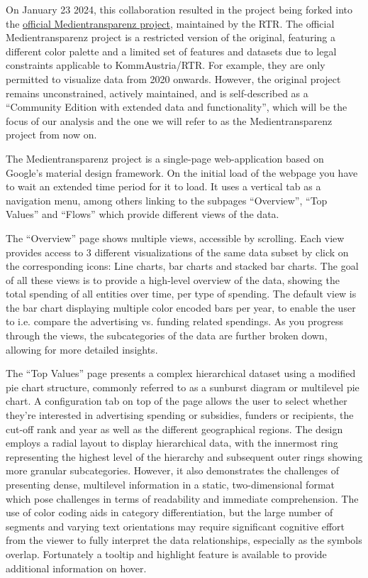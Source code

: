 \documentclass{vgtc}
\begin{document}
On January 23 2024, this collaboration resulted in the project being forked into the \href{https://visualisierung.medientransparenz.rtr.at/home}{official Medientransparenz project}, maintained by the RTR. The official Medientransparenz project is a restricted version of the original, featuring a different color palette and a limited set of features and datasets due to legal constraints applicable to KommAustria/RTR. For example, they are only permitted to visualize data from 2020 onwards. However, the original project remains unconstrained, actively maintained, and is self-described as a ``Community Edition with extended data and functionality'', which will be the focus of our analysis and the one we will refer to as the Medientransparenz project from now on.

The Medientransparenz project is a single-page web-application based on Google's material design framework. On the initial load of the webpage you have to wait an extended time period for it to load. It uses a vertical tab as a navigation menu, among others linking to the subpages ``Overview'', ``Top Values'' and ``Flows'' which provide different views of the data.

The ``Overview'' page shows multiple views, accessible by scrolling. Each view provides access to 3 different visualizations of the same data subset by click on the corresponding icons: Line charts, bar charts and stacked bar charts. The goal of all these views is to provide a high-level overview of the data, showing the total spending of all entities over time, per type of spending. The default view is the bar chart displaying multiple color encoded bars per year, to enable the user to i.e. compare the advertising vs. funding related spendings. As you progress through the views, the subcategories of the data are further broken down, allowing for more detailed insights. 

The ``Top Values'' page presents a complex hierarchical dataset using a modified pie chart structure, commonly referred to as a sunburst diagram or multilevel pie chart. A configuration tab on top of the page allows the user to select whether they're interested in advertising spending or subsidies, funders or recipients, the cut-off rank and year as well as the different geographical regions.
The design employs a radial layout to display hierarchical data, with the innermost ring representing the highest level of the hierarchy and subsequent outer rings showing more granular subcategories. However, it also demonstrates the challenges of presenting dense, multilevel information in a static, two-dimensional format which pose challenges in terms of readability and immediate comprehension. The use of color coding aids in category differentiation, but the large number of segments and varying text orientations may require significant cognitive effort from the viewer to fully interpret the data relationships, especially as the symbols overlap. Fortunately a tooltip and highlight feature is available to provide additional information on hover.
\end{document}
